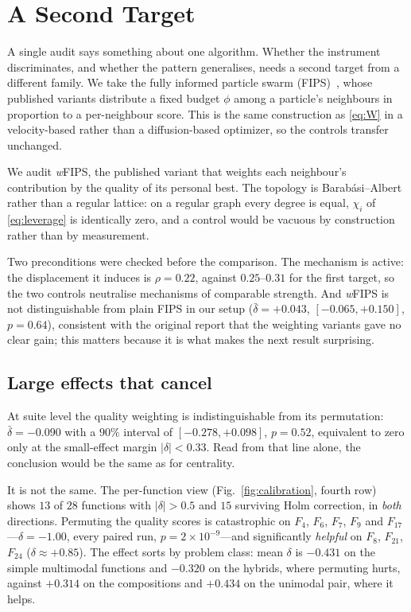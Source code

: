 \section{A Second Target}
\label{sec:target2}

A single audit says something about one algorithm. Whether the instrument
discriminates, and whether the pattern generalises, needs a second target from
a different family. We take the fully informed particle swarm
(FIPS)~\cite{mendes2004fully}, whose published variants distribute a fixed
budget $\phi$ among a particle's neighbours in proportion to a per-neighbour
score. This is the same construction as \eqref{eq:W} in a velocity-based
rather than a diffusion-based optimizer, so the controls transfer unchanged.

We audit \emph{w}FIPS, the published variant that weights each neighbour's
contribution by the quality of its personal best. The topology is
Barab\'{a}si--Albert rather than a regular lattice: on a regular graph every
degree is equal, $\chi_i$ of \eqref{eq:leverage} is identically zero, and a
control would be vacuous by construction rather than by measurement.

Two preconditions were checked before the comparison. The mechanism is active:
the displacement it induces is $\rho=0.22$, against $0.25$--$0.31$ for the
first target, so the two controls neutralise mechanisms of comparable
strength. And \emph{w}FIPS is not distinguishable from plain FIPS in our setup
($\bar{\delta}=+0.043$, $[-0.065,+0.150]$, $p=0.64$), consistent with the
original report that the weighting variants gave no clear gain; this matters
because it is what makes the next result surprising.

\subsection{Large effects that cancel}
\label{sec:target2:result}

At suite level the quality weighting is indistinguishable from its permutation:
$\bar{\delta}=-0.090$ with a $90\%$ interval of $[-0.278,+0.098]$, $p=0.52$,
equivalent to zero only at the small-effect margin $|\delta|<0.33$. Read from
that line alone, the conclusion would be the same as for centrality.

It is not the same. The per-function view (Fig.~\ref{fig:calibration}, fourth
row) shows $13$ of $28$ functions with $|\delta|>0.5$ and $15$ surviving Holm
correction, in \emph{both} directions. Permuting the quality scores is
catastrophic on $F_4$, $F_6$, $F_7$, $F_9$ and $F_{17}$---$\delta=-1.00$,
every paired run, $p=2\times10^{-9}$---and significantly \emph{helpful} on
$F_8$, $F_{21}$, $F_{24}$ ($\delta\approx+0.85$). The effect sorts by problem
class: mean $\delta$ is $-0.431$ on the simple multimodal functions and
$-0.320$ on the hybrids, where permuting hurts, against $+0.314$ on the
compositions and $+0.434$ on the unimodal pair, where it helps.

